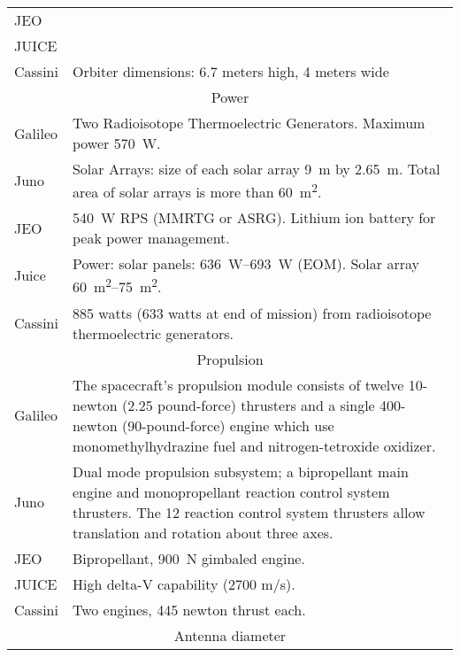 \begin{longtable}{lp{}}
  JEO & \\

  JUICE & \\

  Cassini & Orbiter dimensions: 6.7 meters high, 4 meters wide \\

  \multicolumn{2}{c}{Power} \\ \midrule

  Galileo & Two Radio\-isotope Thermoelectric Generators. Maximum power
  \SI{570}{W}. \\

  Juno & Solar Arrays: size of each solar array \SI{9}{m} by
  \SI{2.65}{m}. Total area of solar arrays is more than
  \SI{60}{m^2}. \\

  JEO & \SI{540}{W} RPS (MMRTG or ASRG). Lithium ion battery for peak
  power management. \\

  Juice & Power: solar panels: \SI{636}{W}--\SI{693}{W} (EOM). Solar array
  \SI{60}{m^2}--\SI{75}{m^2}. \\

  Cassini & 885 watts (633 watts at end of mission) from radioisotope
  thermoelectric generators. \\

  \multicolumn{2}{c}{Propulsion} \\ \midrule

  Galileo & The spacecraft's propulsion module consists of twelve
  10-newton (2.25 pound\--force) thrusters and a single 400-newton
  (90-pound-force) engine which use monomethylhydrazine fuel and
  nitrogen-tetroxide oxidizer. \\

  Juno & Dual mode propulsion subsystem; a bipropellant main engine
  and monopropellant reaction control system thrusters. The 12
  reaction control system thrusters allow translation and rotation
  about three axes. \\

  JEO & Bipropellant, \SI{900}{N} gimbaled engine. \\

  JUICE & High delta-V capability (2700 m/s). \\

  Cassini & Two engines, 445 newton thrust each. \\

  \multicolumn{2}{c}{Antenna diameter} \\ \midrule


\end{longtable}
